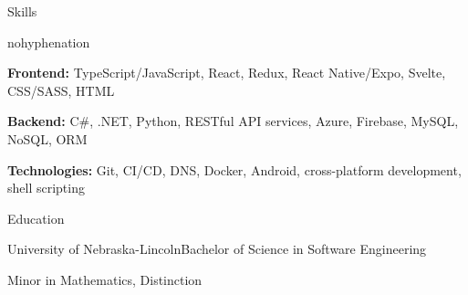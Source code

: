 \documentclass[
	10pt, %
]{article} %
\begin{document}
\begin{rSection}{Skills}
	\begin{hyphenrules}{nohyphenation}

		\begin{rSubsection}{}{}{}{}
			\item[] \textbf{Frontend:} TypeScript/JavaScript, React, Redux, React Native/Expo, Svelte, CSS/SASS, HTML
			\item[] \textbf{Backend:} C\#, .NET, Python, RESTful API services, Azure, Firebase, MySQL, NoSQL, ORM
			\item[] \textbf{Technologies:} Git, CI/CD, DNS, Docker, Android, cross-platform development, shell scripting
		\end{rSubsection}

	\end{hyphenrules}
\end{rSection}

\begin{rSection}{Education}
	\begin{rSubsection}{University of Nebraska-Lincoln}{}{Bachelor of Science in Software Engineering}{}
		\item[] Minor in Mathematics, Distinction
	\end{rSubsection}
\end{rSection}
\end{document}
